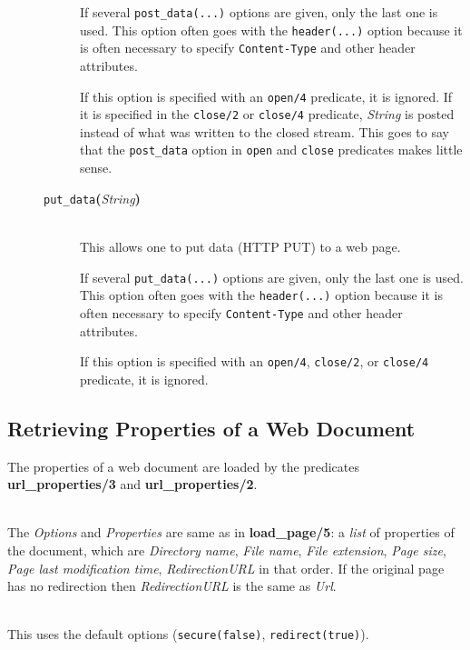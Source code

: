 \begin{description}
\begin{description}
    If several \texttt{post\_data(...)} options are given, only the last one is
    used. This option often goes with the \texttt{header(...)} option because it
    is often necessary to specify \texttt{Content-Type} and other header
    attributes.  

    If this option is specified with an \texttt{open/4} predicate, it is
    ignored.  If it is specified in the \texttt{close/2} or 
    \texttt{close/4}   predicate, \emph{String} is posted instead of what was
    written to the closed stream. This goes to say that the \texttt{post\_data}
    option in \texttt{open} and \texttt{close} predicates makes little sense. 
    \item[{\tt put\_data}{\bf (}{\it String}{\bf )}]\mbox{}\\
    This allows one to put data (HTTP PUT) to a web page.

    If several \texttt{put\_data(...)} options are given, only the last one is
    used. This option often goes with the \texttt{header(...)} option because it
    is often necessary to specify \texttt{Content-Type} and other header
    attributes.  

    If this option is specified with an \texttt{open/4},
    \texttt{close/2}, or \texttt{close/4} predicate, it is
    ignored.
  \end{description}

\end{description}

\subsection{Retrieving Properties of a Web Document}

The properties of a web document are loaded by the predicates {\bf
  url\_properties/3} and {\bf url\_properties/2}. 

\begin{description}
\item[url\_properties({\it +Url, +Options, -Properties})]\mbox{}
  \\
  The {\it Options} and {\it Properties} are same as in {\bf load\_page/5}:
  a \emph{list} of properties of the document, which
  are {\it Directory name}, {\it File name}, {\it File extension}, {\it
    Page size}, {\it Page last modification time}, \emph{RedirectionURL} 
  in that order. If the original page has no redirection then
  \emph{RedirectionURL} is the same as \emph{Url}. 
\item[url\_properties({\it +Url, -Properties})]\mbox{}
  \\
  This uses the default options (\texttt{secure(false)}, \texttt{redirect(true)}). 

\end{description}

